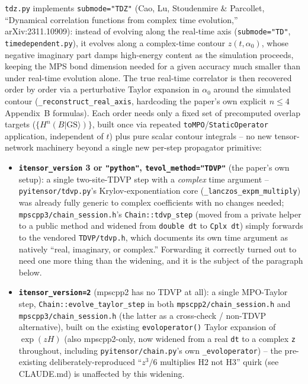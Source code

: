 \documentclass[11pt]{article}
\begin{document}
\texttt{tdz.py} implements \texttt{submode="TDZ"} (Cao, Lu, Stoudenmire
\& Parcollet, ``Dynamical correlation functions from complex time
evolution,'' arXiv:2311.10909): instead of evolving along the real-time
axis (\texttt{submode="TD"}, \texttt{timedependent.py}), it evolves
along a complex-time contour $z(t,\alpha_0)$, whose negative imaginary
part damps high-energy content as the simulation proceeds, keeping the
MPS bond dimension needed for a given accuracy much smaller than under
real-time evolution alone. The true real-time correlator is then
recovered order by order via a perturbative Taylor expansion in
$\alpha_0$ around the simulated contour
(\texttt{\_reconstruct\_real\_axis}, hardcoding the paper's own explicit
$n\le4$ Appendix~B formulas). Each order needs only a fixed set of
precomputed overlap targets ($\{H^n(B|\mathrm{GS}\rangle)\}$, built once
via repeated \texttt{toMPO}/\texttt{StaticOperator} application,
independent of $t$) plus pure scalar contour integrals -- no new
tensor-network machinery beyond a single new per-step propagator
primitive:

\begin{itemize}
\item \textbf{\texttt{itensor\_version} 3 or \texttt{"python"},
\texttt{tevol\_method="TDVP"}} (the paper's own setup): a single
two-site-TDVP step with a \emph{complex} time argument --
\texttt{pyitensor/tdvp.py}'s Krylov-exponentiation core
(\texttt{\_lanczos\_expm\_multiply}) was already fully generic to
complex coefficients with no changes needed;
\texttt{mpscpp3/chain\_session.h}'s \texttt{Chain::tdvp\_step} (moved
from a private helper to a public method and widened from
\texttt{double dt} to \texttt{Cplx dt}) simply forwards to the vendored
\texttt{TDVP/tdvp.h}, which documents its own time argument as natively
``real, imaginary, or complex.'' Forwarding it correctly turned out to
need one more thing than the widening, and it is the subject of the
paragraph below.
\item \textbf{\texttt{itensor\_version=2}} (mpscpp2 has no TDVP at
all): a single MPO-Taylor step, \texttt{Chain::evolve\_taylor\_step} in
both \texttt{mpscpp2/chain\_session.h} and
\texttt{mpscpp3/chain\_session.h} (the latter as a cross-check /
non-TDVP alternative), built on the existing \texttt{evoloperator()}
Taylor expansion of $\exp(zH)$ (also mpscpp2-only, now widened from a
real \texttt{dt} to a complex \texttt{z} throughout, including
\texttt{pyitensor/chain.py}'s own \texttt{\_evoloperator}) -- the
pre-existing deliberately-reproduced ``$z^3/6$ multiplies H2 not H3''
quirk (see CLAUDE.md) is unaffected by this widening.
\end{itemize}
\end{document}
